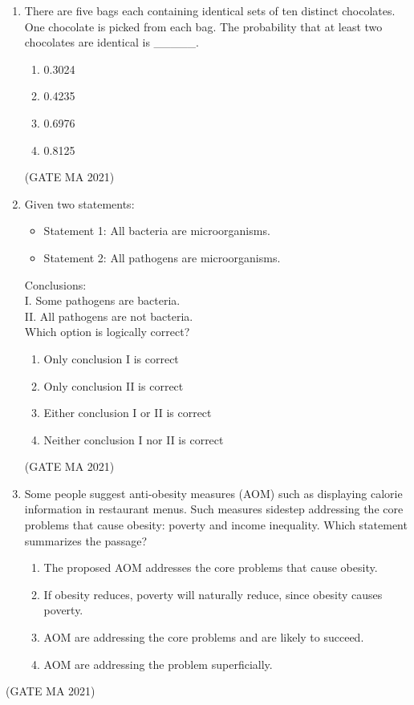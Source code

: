 \documentclass[journal,12pt,onecolumn]{IEEEtran}
\theoremstyle{remark}
\begin{document}
\begin{enumerate}
    \item There are five bags each containing identical sets of ten distinct chocolates. One chocolate is picked from each bag. The probability that at least two chocolates are identical is \_\_\_\_\_.
    \begin{enumerate}
        \item 0.3024
        \item 0.4235
        \item 0.6976
        \item 0.8125
    \end{enumerate}
\hfill(GATE MA 2021)
    \item Given two statements:
    \begin{itemize}
        \item Statement 1: All bacteria are microorganisms.
        \item Statement 2: All pathogens are microorganisms.
    \end{itemize}
    Conclusions: \\
    I. Some pathogens are bacteria.\\
    II. All pathogens are not bacteria.\\
    Which option is logically correct?
    \begin{enumerate}
        \item Only conclusion I is correct
        \item Only conclusion II is correct
        \item Either conclusion I or II is correct
        \item Neither conclusion I nor II is correct
    \end{enumerate}
\hfill(GATE MA 2021)
    \item Some people suggest anti-obesity measures (AOM) such as displaying calorie information in restaurant menus. Such measures sidestep addressing the core problems that cause obesity: poverty and income inequality. Which statement summarizes the passage?
    \begin{enumerate}
        \item The proposed AOM addresses the core problems that cause obesity.
        \item If obesity reduces, poverty will naturally reduce, since obesity causes poverty.
        \item AOM are addressing the core problems and are likely to succeed.
        \item AOM are addressing the problem superficially.
    \end{enumerate}
\end{enumerate}
\hfill(GATE MA 2021)
\end{document}
